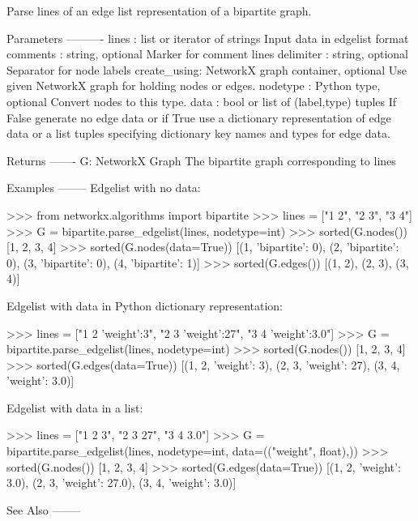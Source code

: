 \begin{DoxyVerb}Parse lines of an edge list representation of a bipartite graph.

Parameters
----------
lines : list or iterator of strings
    Input data in edgelist format
comments : string, optional
   Marker for comment lines
delimiter : string, optional
   Separator for node labels
create_using: NetworkX graph container, optional
   Use given NetworkX graph for holding nodes or edges.
nodetype : Python type, optional
   Convert nodes to this type.
data : bool or list of (label,type) tuples
   If False generate no edge data or if True use a dictionary
   representation of edge data or a list tuples specifying dictionary
   key names and types for edge data.

Returns
-------
G: NetworkX Graph
    The bipartite graph corresponding to lines

Examples
--------
Edgelist with no data:

>>> from networkx.algorithms import bipartite
>>> lines = ["1 2", "2 3", "3 4"]
>>> G = bipartite.parse_edgelist(lines, nodetype=int)
>>> sorted(G.nodes())
[1, 2, 3, 4]
>>> sorted(G.nodes(data=True))
[(1, {'bipartite': 0}), (2, {'bipartite': 0}), (3, {'bipartite': 0}), (4, {'bipartite': 1})]
>>> sorted(G.edges())
[(1, 2), (2, 3), (3, 4)]

Edgelist with data in Python dictionary representation:

>>> lines = ["1 2 {'weight':3}", "2 3 {'weight':27}", "3 4 {'weight':3.0}"]
>>> G = bipartite.parse_edgelist(lines, nodetype=int)
>>> sorted(G.nodes())
[1, 2, 3, 4]
>>> sorted(G.edges(data=True))
[(1, 2, {'weight': 3}), (2, 3, {'weight': 27}), (3, 4, {'weight': 3.0})]

Edgelist with data in a list:

>>> lines = ["1 2 3", "2 3 27", "3 4 3.0"]
>>> G = bipartite.parse_edgelist(lines, nodetype=int, data=(("weight", float),))
>>> sorted(G.nodes())
[1, 2, 3, 4]
>>> sorted(G.edges(data=True))
[(1, 2, {'weight': 3.0}), (2, 3, {'weight': 27.0}), (3, 4, {'weight': 3.0})]

See Also
--------
\end{DoxyVerb}
 \mbox{\label{namespacenetworkx_1_1algorithms_1_1bipartite_1_1edgelist_a7a2bfc7f57eb2ce55cc6fef9331c8793}} 
